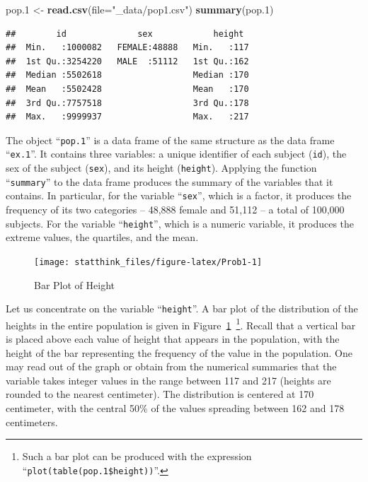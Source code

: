 \documentclass[
]{krantz}
\makeatletter
\newenvironment{Shaded}{\begin{snugshade}}{\end{snugshade}}
\newcommand{\DataTypeTok}[1]{\textcolor[rgb]{0.13,0.29,0.53}{#1}}
\newcommand{\FloatTok}[1]{\textcolor[rgb]{0.00,0.00,0.81}{#1}}
\newcommand{\KeywordTok}[1]{\textcolor[rgb]{0.13,0.29,0.53}{\textbf{#1}}}
\newcommand{\NormalTok}[1]{#1}
\newcommand{\StringTok}[1]{\textcolor[rgb]{0.31,0.60,0.02}{#1}}
\newenvironment{kframe}{%
\medskip{}
\setlength{\fboxsep}{.8em}
 \def\at@end@of@kframe{}%
 \ifinner\ifhmode%
  \def\at@end@of@kframe{\end{minipage}}%
  \begin{minipage}{\columnwidth}%
 \fi\fi%
 \def\FrameCommand##1{\hskip\@totalleftmargin \hskip-\fboxsep
 \colorbox{shadecolor}{##1}\hskip-\fboxsep
     \hskip-\linewidth \hskip-\@totalleftmargin \hskip\columnwidth}%
 \MakeFramed {\advance\hsize-\width
   \@totalleftmargin\z@ \linewidth\hsize
   \@setminipage}}%
 {\par\unskip\endMakeFramed%
 \at@end@of@kframe}
\renewenvironment{Shaded}{\begin{kframe}}{\end{kframe}}
\theoremstyle{definition}
\theoremstyle{definition}
\theoremstyle{definition}
\theoremstyle{remark}
\makeatother
\begin{document}
\begin{Shaded}
\begin{Highlighting}[]
\NormalTok{pop}\FloatTok{.1}\NormalTok{ <-}\StringTok{ }\KeywordTok{read.csv}\NormalTok{(}\DataTypeTok{file=}\StringTok{"_data/pop1.csv"}\NormalTok{)}
\KeywordTok{summary}\NormalTok{(pop}\FloatTok{.1}\NormalTok{)}
\end{Highlighting}
\end{Shaded}

\begin{verbatim}
##        id              sex            height   
##  Min.   :1000082   FEMALE:48888   Min.   :117  
##  1st Qu.:3254220   MALE  :51112   1st Qu.:162  
##  Median :5502618                  Median :170  
##  Mean   :5502428                  Mean   :170  
##  3rd Qu.:7757518                  3rd Qu.:178  
##  Max.   :9999937                  Max.   :217
\end{verbatim}

The object ``\texttt{pop.1}'' is a data frame of the same structure as the data
frame ``\texttt{ex.1}''. It contains three variables: a unique identifier of each
subject (\texttt{id}), the sex of the subject (\texttt{sex}), and its height
(\texttt{height}). Applying the function ``\texttt{summary}'' to the data frame produces
the summary of the variables that it contains. In particular, for the
variable ``\texttt{sex}'', which is a factor, it produces the frequency of its
two categories -- 48,888 female and 51,112 -- a total of 100,000 subjects.
For the variable ``\texttt{height}'', which is a numeric variable, it produces
the extreme values, the quartiles, and the mean.

\begin{figure}

{\centering \texttt{[image: statthink\_files/figure-latex/Prob1-1]} 

}

\caption{Bar Plot of Height}\label{fig:Prob1}
\end{figure}

Let us concentrate on the variable ``\texttt{height}''. A bar plot of the
distribution of the heights in the entire population is given in
Figure~\ref{fig:Prob1}~\footnote{Such a bar plot can be produced with the expression
  ``\texttt{plot(table(pop.1\$height))}''.}. Recall that a vertical bar is placed
above each value of height that appears in the population, with the
height of the bar representing the frequency of the value in the
population. One may read out of the graph or obtain from the numerical
summaries that the variable takes integer values in the range between
117 and 217 (heights are rounded to the nearest centimeter). The
distribution is centered at 170 centimeter, with the central 50\% of the
values spreading between 162 and 178 centimeters.
\end{document}
